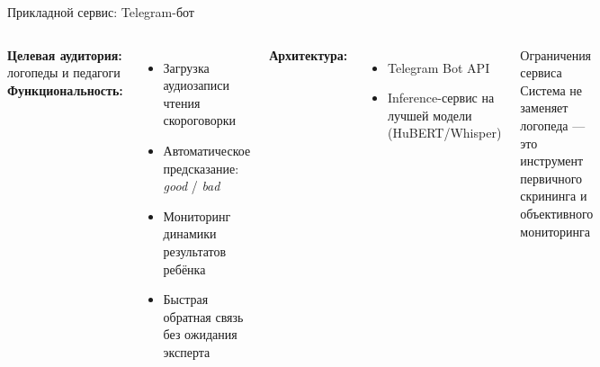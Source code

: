 \documentclass[aspectratio=169]{beamer}
\begin{document}
\begin{frame}{Прикладной сервис: Telegram-бот}
  \begin{columns}[T]
      \textbf{Целевая аудитория:} логопеды и педагоги\\[0.5em]
      \textbf{Функциональность:}
      \begin{itemize}
        \item Загрузка аудиозаписи чтения скороговорки
        \item Автоматическое предсказание: \textit{good} / \textit{bad}
        \item Мониторинг динамики результатов ребёнка
        \item Быстрая обратная связь без ожидания эксперта
      \end{itemize}
      \vspace{0.5em}
      \textbf{Архитектура:}
      \begin{itemize}
        \item Telegram Bot API
        \item Inference-сервис на лучшей модели (HuBERT/Whisper)
      \end{itemize}
      \begin{block}{Ограничения сервиса}
        \small Система не заменяет логопеда — это инструмент первичного скрининга и объективного мониторинга
      \end{block}
  \end{columns}
\end{frame}
\end{document}
